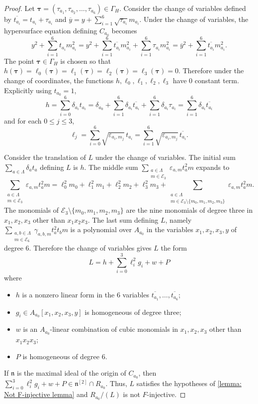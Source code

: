 \documentclass[reqno,11pt]{amsart}
\numberwithin{equation}{section}
\theoremstyle{definition}
\theoremstyle{definition}
\theoremstyle{definition}
\theoremstyle{remark}
\newcommand{\fn}{\mathfrak{n}}
\begin{document}
\begin{proof}
    Let $\mathbf{\tau} = (\tau_{a_1},\tau_{a_2},\ldots,\tau_{a_6})\in \Gamma_H$. Consider the change of variables defined by $\overline{t_{a_i}} = t_{a_i}+\tau_{a_i}$ and $\overline{y} = y+\sum_{i=1}^6\sqrt{\tau_{a_i}}m_{a_i}$. Under the change of variables, the hypersurface equation defining $C_{a_0}$ becomes
    \[
    y^2 + \sum_{i=1}^6t_{a_i}m_{a_i}^2 = y^2 + \sum_{i=1}^6\overline{t_{a_i}}m_{a_i}^2 + \sum_{i=1}^6\tau_{a_i}m_{a_i}^2 = \overline{y}^2 + \sum_{i=1}^6\overline{t_{a_i}}m_{a_i}^2.
    \]
    The point $\mathbf{\tau}\in \Gamma_H$ is chosen so that $h(\mathbf{\tau}) = \ell_0(\mathbf{\tau}) = \ell_1(\mathbf{\tau})=\ell_2(\mathbf{\tau})=\ell_3(\mathbf{\tau}) = 0$. Therefore under the change of coordinates, the functions $h,\ell_0,\ell_1,\ell_2,\ell_3$ have $0$ constant term. Explicitly using $t_{a_0}=1$,
    \[
    h = \sum_{i=0}^6\delta_{a_i}t_{a_i} =\delta_{a_0} +  \sum_{i=1}^6\delta_{a_i}\overline{t_{a_i}} + \sum_{i=1}^6\delta_{a_i}\tau_{a_i} = \sum_{i=1}^6\delta_{a_i}\overline{t_{a_i}}
    \]
    and for each $0\leq j\leq 3$,
    \[
    \ell_{j} = \sum_{i=0}^6 \sqrt{\varepsilon_{a_i,m_j}}\,t_{a_i} = \sum_{i=1}^6 \sqrt{\varepsilon_{a_i,m_j}}\,\overline{t_{a_i}}.
    \]

    Consider the translation of $L$ under the change of variables. The initial sum $\sum_{a\in\Lambda}\delta_at_a$ defining $L$ is $h$. The middle sum $\sum_{\substack{a\in\Lambda\\m\in\mathcal{E}_3}} \varepsilon_{a,m}t_a^2m$ expands to \[ \sum_{\substack{a\in\Lambda\\m\in\mathcal{E}_3}} \varepsilon_{a,m}t_a^2m = \ell_0^2m_0 + \ell_1^2m_1 +\ell_2^2m_2 + \ell_3^2m_3 + \sum_{\substack{a\in\Lambda \\ m\in\mathcal{E}_3\setminus\{m_0,m_1,m_2,m_3\}}}\varepsilon_{a,m}t_a^2m. \] The monomials of $\mathcal{E}_3\setminus\{m_0,m_1,m_2,m_3\}$ are the nine monomials of degree three in $x_1,x_2,x_3$ other than $x_1x_2x_3$. The last sum defining $L$, namely $\sum_{\substack{a,b\in\Lambda\\m\in\mathcal{E}_6}} \gamma_{a,b,m}t_a^2t_bm$ is a polynomial over $A_{a_0}$ in the variables $x_1,x_2,x_3,y$ of degree $6$. Therefore the change of variables gives $L$ the form
    \[
    L = h + \sum_{i=0}^3\ell_i^2g_i + w + P
    \]
    where
    \begin{itemize}
        \item $h$ is a nonzero linear form in the $6$ variables $\overline{t_{a_1}},\ldots,\overline{t_{a_6}}$;
        \item $g_i\in A_{a_0}[x_1,x_2,x_3,y]$ is homogeneous of degree three;
        \item $w$ is an $A_{a_0}$-linear combination of cubic monomials in $x_1,x_2,x_3$ other than $x_1x_2x_3$;
        \item $P$ is homogeneous of degree $6$.
    \end{itemize}
    If $\fn$ is the maximal ideal of the origin of $C_{a_0}$, then $\sum_{i=0}^3\ell_i^2g_i+w+P\in \fn^{[2]}\cap R_{a_0}$. Thus, $L$ satisfies the hypotheses of \cref{lemma: Not F-injective lemma} and $R_{a_0}/(L)$ is not $F$-injective.
\end{proof}
\end{document}

